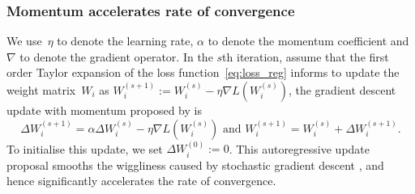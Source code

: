 \subsubsection{Momentum accelerates rate of convergence}
We use~$\eta$ to denote the learning rate, $\alpha$ to denote the momentum coefficient and $\nabla$ to denote the gradient operator. In the $s$th iteration, assume that the first order Taylor expansion of the loss function~\eqref{eq:loss_reg} informs to update the weight matrix~$W_i$ as $W_i^{(s+1)}:=W_i^{(s)}-\eta\nabla L(W_i^{(s)})$, the gradient descent update with momentum proposed by \citet{rumelhart1986learning} is
\begin{equation*}
    \Delta W_i^{(s+1)}=\alpha \Delta W_i^{(s)}-\eta \nabla L(W_i^{(s)})\text{ and } W_i^{(s+1)}=W_i^{(s)}+\Delta W_i^{(s+1)}.
\end{equation*}
To initialise this update, we set $\Delta W_i^{(0)}:=0$. This autoregressive update proposal smooths the wiggliness caused by stochastic gradient descent \citep{rumelhart1986learning}, and hence significantly accelerates the rate of convergence.

